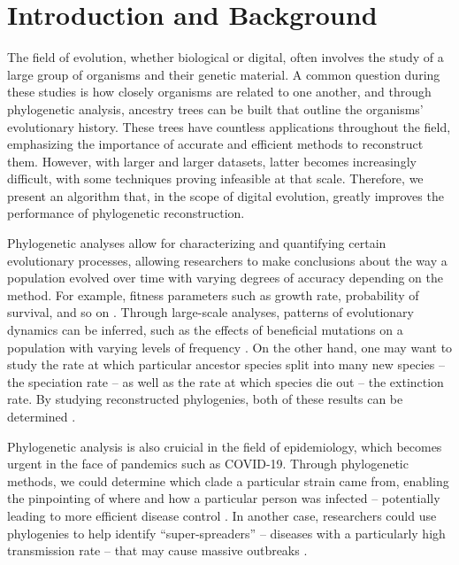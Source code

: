 \section{Introduction and Background} \label{sec:introduction}

The field of evolution, whether biological or digital, often involves the study of a large group of organisms and their genetic material. A common question during these studies is how closely organisms are related to one another, and through phylogenetic analysis, ancestry trees can be built that outline the organisms' evolutionary history. These trees have countless applications throughout the field, emphasizing the importance of accurate and efficient methods to reconstruct them. However, with larger and larger datasets, latter becomes increasingly difficult, with some techniques proving infeasible at that scale. Therefore, we present an algorithm that, in the scope of digital evolution, greatly improves the performance of phylogenetic reconstruction.

Phylogenetic analyses allow for characterizing and quantifying certain evolutionary processes, allowing researchers to make conclusions about the way a population evolved over time with varying degrees of accuracy depending on the method. For example, fitness parameters such as growth rate, probability of survival, and so on \citep{genthon2023cell}. Through large-scale analyses, patterns of evolutionary dynamics can be inferred, such as the effects of beneficial mutations on a population with varying levels of frequency \citep{levy2015quantitative}. On the other hand, one may want to study the rate at which particular ancestor species split into many new species -- the speciation rate -- as well as the rate at which species die out -- the extinction rate. By studying reconstructed phylogenies, both of these results can be determined \citep{stadler2013recovering}.

Phylogenetic analysis is also cruicial in the field of epidemiology, which becomes urgent in the face of pandemics such as COVID-19. Through phylogenetic methods, we could determine which clade a particular strain came from, enabling the pinpointing of where and how a particular person was infected -- potentially leading to more efficient disease control \citep{wang2020role}. In another case, researchers could use phylogenies to help identify ``super-spreaders'' -- diseases with a particularly high transmission rate -- that may cause massive outbreaks \citep{colijn2014phylogenetic}.

